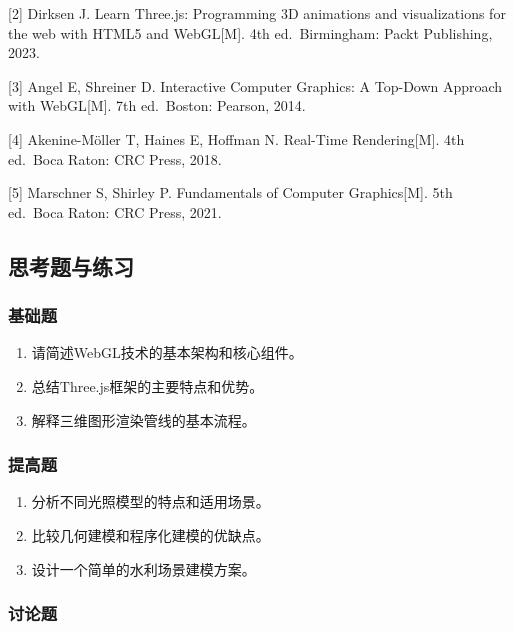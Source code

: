 {[}2{]} Dirksen J. Learn Three.js: Programming 3D animations and visualizations for the web with HTML5 and WebGL{[}M{]}. 4th ed.~Birmingham: Packt Publishing, 2023.

{[}3{]} Angel E, Shreiner D. Interactive Computer Graphics: A Top-Down Approach with WebGL{[}M{]}. 7th ed.~Boston: Pearson, 2014.

{[}4{]} Akenine-Möller T, Haines E, Hoffman N. Real-Time Rendering{[}M{]}. 4th ed.~Boca Raton: CRC Press, 2018.

{[}5{]} Marschner S, Shirley P. Fundamentals of Computer Graphics{[}M{]}. 5th ed.~Boca Raton: CRC Press, 2021.

\hypertarget{ux601dux8003ux9898ux4e0eux7ec3ux4e60}{%
\subsection{思考题与练习}\label{ux601dux8003ux9898ux4e0eux7ec3ux4e60}}

\hypertarget{ux57faux7840ux9898}{%
\subsubsection{基础题}\label{ux57faux7840ux9898}}

\begin{enumerate}
\def\labelenumi{\arabic{enumi}.}
\tightlist
\item
  请简述WebGL技术的基本架构和核心组件。
\item
  总结Three.js框架的主要特点和优势。
\item
  解释三维图形渲染管线的基本流程。
\end{enumerate}

\hypertarget{ux63d0ux9ad8ux9898}{%
\subsubsection{提高题}\label{ux63d0ux9ad8ux9898}}

\begin{enumerate}
\def\labelenumi{\arabic{enumi}.}
\tightlist
\item
  分析不同光照模型的特点和适用场景。
\item
  比较几何建模和程序化建模的优缺点。
\item
  设计一个简单的水利场景建模方案。
\end{enumerate}

\hypertarget{ux8ba8ux8bbaux9898}{%
\subsubsection{讨论题}\label{ux8ba8ux8bbaux9898}}

